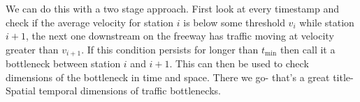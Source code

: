 \documentclass[12pt]{article}
\begin{document}
We can do this with a two stage approach. First look at every timestamp and
check if the average velocity for station $i$ is below some threshold
$v_{i}$ while station $i + 1$, the next one downstream on the freeway has
traffic moving at velocity greater than $v_{i + 1}$. If this condition persists for
longer than $t_{\min}$ then call it a bottleneck between station $i$ and $i
+ 1$. This can then be used to check dimensions of the bottleneck in time
and space. There we go- that's a great title- Spatial temporal dimensions
of traffic bottlenecks.

 


\end{document}
